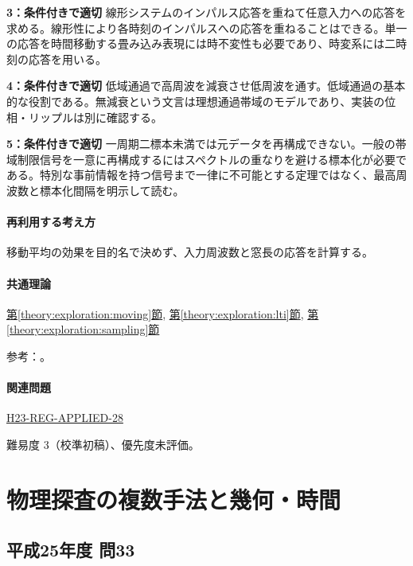 \noindent\textbf{3：条件付きで適切} 線形システムのインパルス応答を重ねて任意入力への応答を求める。線形性により各時刻のインパルスへの応答を重ねることはできる。単一の応答を時間移動する畳み込み表現には時不変性も必要であり、時変系には二時刻の応答を用いる。\par

\noindent\textbf{4：条件付きで適切} 低域通過で高周波を減衰させ低周波を通す。低域通過の基本的な役割である。無減衰という文言は理想通過帯域のモデルであり、実装の位相・リップルは別に確認する。\par

\noindent\textbf{5：条件付きで適切} 一周期二標本未満では元データを再構成できない。一般の帯域制限信号を一意に再構成するにはスペクトルの重なりを避ける標本化が必要である。特別な事前情報を持つ信号まで一律に不可能とする定理ではなく、最高周波数と標本化間隔を明示して読む。\par

\paragraph{再利用する考え方} 移動平均の効果を目的名で決めず、入力周波数と窓長の応答を計算する。

\paragraph{共通理論} \hyperref[theory:exploration:moving]{第\ref*{theory:exploration:moving}節}, \hyperref[theory:exploration:lti]{第\ref*{theory:exploration:lti}節}, \hyperref[theory:exploration:sampling]{第\ref*{theory:exploration:sampling}節}

\par 参考：\cite{mit_signals2010,mit_moving2012,scipy_notch,scipy_fft,usgs_processing2000}。

\paragraph{関連問題} \hyperref[q:h23-reg-applied-28]{H23-REG-APPLIED-28}

\par 難易度 3（校準初稿）、優先度未評価。

\section{物理探査の複数手法と幾何・時間}

\subsection{平成25年度 問33}
\label{q:h25-reg-applied-33}

